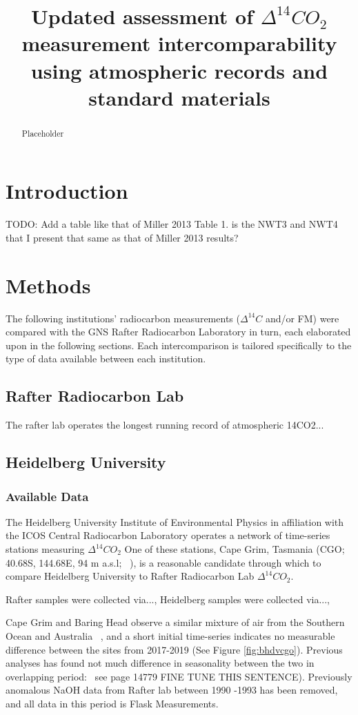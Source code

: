 \documentclass{article}
\title{Updated assessment of ${\Delta^{14}CO_{2}}$ measurement intercomparability using atmospheric records and standard materials}
\begin{document}
\maketitle


\newpage
\begin{abstract}
Placeholder
\end{abstract}


\newpage
\section{Introduction}
TODO: 
Add a table like that of Miller 2013 Table 1. 
is the NWT3 and NWT4 that I present that same as that of Miller 2013 results? 

\newpage
\section{Methods}
The following institutions' radiocarbon measurements (${\Delta^{14}C}$ and/or FM) 
were compared with the GNS Rafter Radiocarbon Laboratory in turn, each elaborated upon in the following sections. Each intercomparison is tailored specifically to the type of data available between each institution. 
\subsection{Rafter Radiocarbon Lab}
The rafter lab operates the longest running record of atmospheric 14CO2...
\subsection{Heidelberg University}
\subsubsection{Available Data}
The Heidelberg University Institute of Environmental Physics in affiliation with the ICOS Central Radiocarbon Laboratory operates a network of time-series stations measuring ${\Delta^{14}CO_{2}}$
One of these stations, Cape Grim, Tasmania (CGO; 40.68S, 144.68E, 94 m a.s.l; ~\cite{levin2010}), is a reasonable candidate through which to compare Heidelberg University to Rafter Radiocarbon Lab ${\Delta^{14}CO_{2}}$. 

Rafter samples were collected via..., Heidelberg samples were collected via...,

Cape Grim and Baring Head observe a similar mixture of air from the Southern Ocean and Australia ~\cite{ziehn2014}, and a short initial time-series indicates no measurable difference between the sites from 2017-2019 (See Figure \ref{fig:bhdvcgo}). 
Previous analyses has found not much difference in seasonality between the two in overlapping period:~\cite{turnbull2017} see page 14779 FINE TUNE THIS SENTENCE). 
Previously anomalous NaOH data from Rafter lab between 1990 -1993 has been removed, and all data in this period is Flask Measurements.
\end{document}
